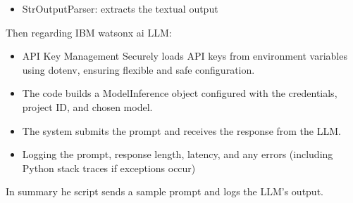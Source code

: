 \documentclass[12pt,a4paper]{article}
\begin{document}
\begin{enumerate}
\begin{itemize}
\begin{itemize}
          \item  StrOutputParser: extracts the textual output
        \end{itemize}
  \end{itemize}
  Then regarding IBM watsonx ai LLM:
  \begin{itemize}
    \item  API Key Management Securely loads API keys from environment variables using dotenv, ensuring flexible and safe configuration.
    \item  The code builds a ModelInference object configured with the credentials, project ID, and chosen model.
    \item  The system submits the prompt and receives the response from the LLM.
    \item  Logging the prompt, response length, latency, and any errors (including Python stack traces if exceptions occur)
  \end{itemize}
  In summary he script sends a sample prompt and logs the LLM’s output.


\end{enumerate}
\end{document}
